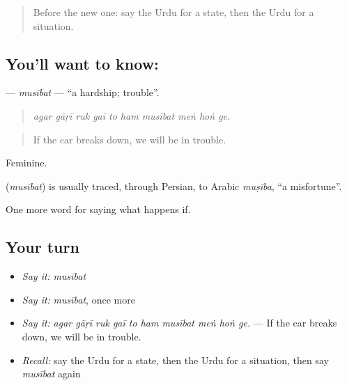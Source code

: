\label{lesson:UR-C365-musibat}



\begin{quote}
Before the new one: say the Urdu for a state, then the Urdu for a situation.
\end{quote}

\subsection*{You'll want to know: }
\textbf{} — \emph{musībat} — \textquotedblleft{}a hardship; trouble\textquotedblright{}.

\begin{quote}
         
\end{quote}

\begin{quote}
\emph{agar gāṛī ruk gaī to ham musībat meṅ hoṅ ge.}
\end{quote}

\begin{quote}
If the car breaks down, we will be in trouble.
\end{quote}

Feminine.

\begin{cousinweb}
\textbf{} (\emph{musībat}) is usually traced, through Persian, to Arabic \emph{muṣība}, \textquotedblleft{}a misfortune\textquotedblright{}.
\end{cousinweb}

\begin{grammarlens}[title={What you've built}]
One more word for saying what happens if.
\end{grammarlens}

\subsection*{Your turn}
\begin{itemize}
\raggedright
  \item \emph{Say it:} \emph{musībat}
  \item \emph{Say it:} \emph{musībat}, once more
  \item \emph{Say it:} \emph{agar gāṛī ruk gaī to ham musībat meṅ hoṅ ge.} — If the car breaks down, we will be in trouble.
  \item \emph{Recall:} say the Urdu for a state, then the Urdu for a situation, then say \emph{musībat} again
\end{itemize}

